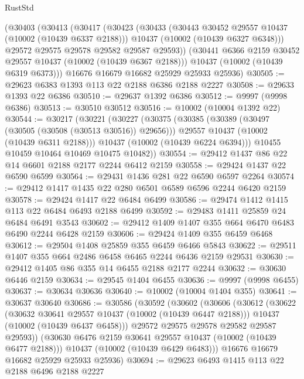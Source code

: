 \begin{lexlean}{RustStd}
\begin{coremodule}
    (@30403
      (@30413
        (@30417
          (@30423
            (@30433
              (@30443 @30452 @29557 @10437 (@10002 (@10439 @6337 @2188)))
              @10437
              (@10002 (@10439 @6327 @6348)))
            @29572
            @29575
            @29578
            @29582
            @29587
            @29593))
        (@30441 @6366 @2159 @30452 @29557 @10437 (@10002 (@10439 @6367 @2188)))
        @10437
        (@10002 (@10439 @6319 @6373)))
      @16676
      @16679
      @16682
      @25929
      @25933
      @25936)
@30505 := @29623 @6383 @1393 @113 @22 @2188 @6386 @2188 @2227
@30508 := @29633 @1393 @22 @6386
@30510 := @29637 @1392 @6386
@30512 := @9997 (@9998 @6386)
@30513 := @30510 @30512
@30516 := @10002 (@10004 @1392 @22)
@30544 := @30217
    (@30221
      (@30227
        (@30375
          (@30385
            (@30389 (@30497 (@30505 (@30508 (@30513 @30516)) @29656)))
            @29557
            @10437
            (@10002 (@10439 @6311 @2188)))
          @10437
          (@10002 (@10439 @6224 @6394)))
        @10455
        @10459
        @10464
        @10469
        @10475
        @10482))
@30554 := @29412 @1437 @86 @22 @14 @6601 @2188 @2177 @2244 @6412 @2159
@30558 := @29424 @1437 @22 @6590 @6599
@30564 := @29431 @1436 @281 @22 @6590 @6597 @2264
@30574 := @29412 @1417 @1435 @22 @280 @6501 @6589 @6596 @2244 @6420 @2159
@30578 := @29424 @1417 @22 @6484 @6499
@30586 := @29474 @1412 @1415 @113 @22 @6484 @6493 @2188 @6499
@30592 := @29483 @1411 @25859 @24 @6484 @6491 @3543
@30602 := @29412 @1409 @1407 @355 @664 @6470 @6483 @6490 @2244 @6428 @2159
@30606 := @29424 @1409 @355 @6459 @6468
@30612 := @29504 @1408 @25859 @355 @6459 @6466 @5843
@30622 := @29511 @1407 @355 @664 @2486 @6458 @6465 @2244 @6436 @2159 @29531
@30630 := @29412 @1405 @86 @355 @14 @6455 @2188 @2177 @2244
@30632 := @30630 @6446 @2159
@30634 := @29545 @1404 @6455
@30636 := @9997 (@9998 @6455)
@30637 := @30634 @30636
@30640 := @10002 (@10004 @1404 @355)
@30641 := @30637 @30640
@30686 := @30586
    (@30592
      (@30602
        (@30606
          (@30612
            (@30622
              (@30632 @30641 @29557 @10437 (@10002 (@10439 @6447 @2188)))
              @10437
              (@10002 (@10439 @6437 @6458)))
            @29572
            @29575
            @29578
            @29582
            @29587
            @29593))
        (@30630 @6476 @2159 @30641 @29557 @10437 (@10002 (@10439 @6477 @2188)))
        @10437
        (@10002 (@10439 @6429 @6483)))
      @16676
      @16679
      @16682
      @25929
      @25933
      @25936)
@30694 := @29623 @6493 @1415 @113 @22 @2188 @6496 @2188 @2227

\end{coremodule}
\end{lexlean}
